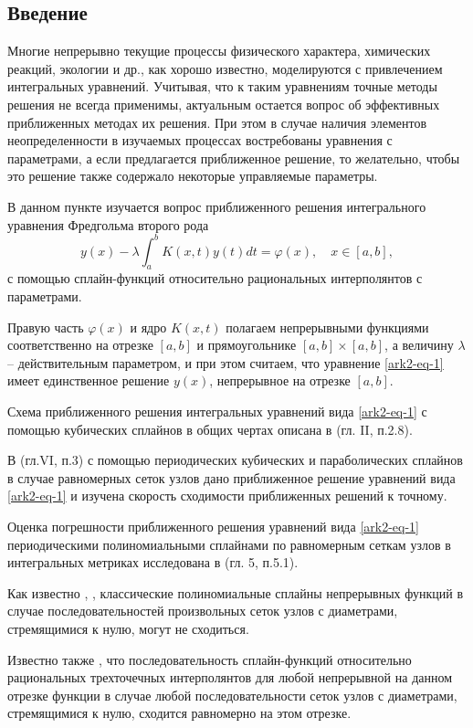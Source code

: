 \subsection{Введение}
Многие непрерывно текущие процессы физического характера, химических реакций,
экологии и др., как хорошо известно, моделируются с привлечением
интегральных уравнений.
Учитывая, что к таким уравнениям точные методы решения не всегда применимы,
актуальным
остается вопрос об эффективных приближенных методах их решения. При этом
в случае наличия
элементов
неопределенности в изучаемых процессах востребованы уравнения с параметрами,
а если
предлагается приближенное решение, то желательно, чтобы это решение также
содержало некоторые управляемые параметры.

В данном пункте изучается вопрос приближенного решения интегрального уравнения
Фредгольма второго рода
\begin{equation}\label{ark2-eq-1}
y(x)-\lambda \int_a^b K(x,t)y(t)dt=\varphi(x),\quad x\in[a,b],
\end{equation}
с помощью сплайн-функций относительно рациональных интерполянтов с параметрами.

Правую часть $\varphi(x)$ и ядро $K(x,t)$ полагаем непрерывными функциями соответственно
на отрезке $[a,b]$ и прямоугольнике $[a,b]\times[a,b]$, а величину $\lambda$ -- действительным
параметром, и при этом считаем, что уравнение \eqref{ark2-eq-1} имеет единственное решение $y(x)$, непрерывное
на отрезке $[a,b]$.

Схема приближенного решения интегральных уравнений вида \eqref{ark2-eq-1} с помощью кубических сплайнов
в общих чертах описана в \cite{ark-4} (гл. II, п.2.8).

В \cite{ark-7} (гл.VI, п.3) с помощью периодических кубических и параболических сплайнов
в случае равномерных сеток узлов дано приближенное решение уравнений вида \eqref{ark2-eq-1}
и изучена скорость сходимости приближенных решений к точному.

Оценка погрешности приближенного решения уравнений вида \eqref{ark2-eq-1} периодическими полиномиальными
сплайнами по равномерным сеткам узлов в интегральных метриках исследована в
\cite{ark-12} (гл. 5, п.5.1).

Как известно \cite{ark-4}, \cite{ark-7}, классические полиномиальные сплайны непрерывных функций
в случае последовательностей произвольных сеток узлов с диаметрами, стремящимися к нулю,
могут не сходиться.

Известно также \cite{ark-9}, что последовательность сплайн-функций относительно рациональных
 трехточечных интерполянтов для любой непрерывной на данном отрезке функции в случае
любой последовательности сеток узлов с диаметрами, стремящимися к нулю, сходится равномерно
 на этом отрезке.


